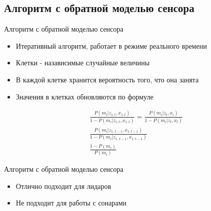 \documentclass[9pt]{beamer}
\begin{document}
\subsection{Алгоритм с обратной моделью сенсора}

\begin{frame}{Алгоритм с обратной моделью сенсора}

\begin{itemize}
  \item
  {
    Итеративный алгоритм, работает в режиме реального времени
  }
  \item
  {
    Клетки - назависимые случайные величины
  }
  \item
  {
    В каждой клетке хранится вероятность того, что она занята
  }
  \item
  {
    Значения в клетках обновляются по формуле

    \begin{equation}
      \begin{split}
        \frac{P(m_i | z_{1:t}, x_{1:t})}{1 - P(m_i | z_{1:t}, x_{1:t})} = 
        \frac{P(m_i | z_t, x_t)}{1- P(m_i | z_t, x_t)}\\
        \frac{P(m_i | z_{1..t-1}, x_{1:t-1})}{1- P(m_i | z_{1..t-1}, x_{1:t-1})}\\
        \frac{1 - P(m_i)}{P(m_{i})}
      \end{split}
    \end{equation}
  }
\end{itemize}
\end{frame}

\begin{frame}{Алгоритм с обратной моделью сенсора}

\begin{itemize}
  \item
  {
    Отлично подходит для лидаров
  }
  \item
  {
    Не подходит для работы с сонарами
  }
\end{itemize}
\end{frame}
\end{document}
